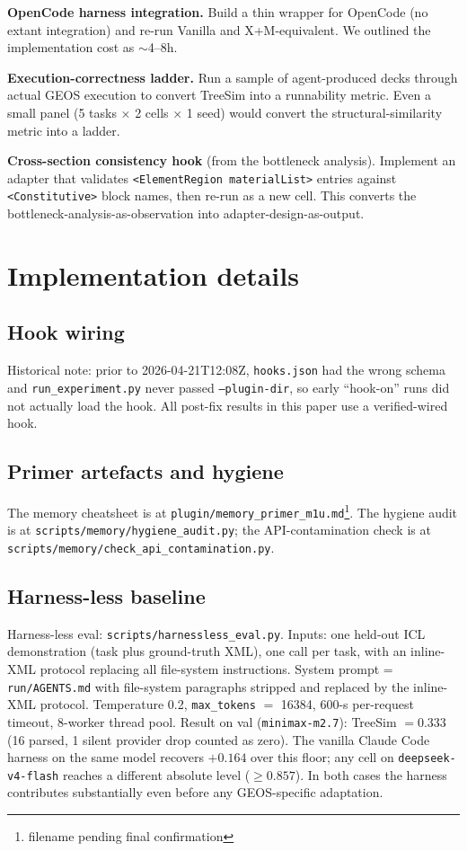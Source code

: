 \documentclass{article}
\begin{document}
\textbf{OpenCode harness integration.} Build a thin wrapper for OpenCode (no extant integration) and re-run Vanilla and X+M-equivalent. We outlined the implementation cost as $\sim$4--8h.

\textbf{Execution-correctness ladder.} Run a sample of agent-produced decks through actual GEOS execution to convert TreeSim into a runnability metric. Even a small panel (5 tasks × 2 cells × 1 seed) would convert the structural-similarity metric into a ladder.

\textbf{Cross-section consistency hook} (from the bottleneck analysis). Implement an adapter that validates \texttt{<ElementRegion materialList>} entries against \texttt{<Constitutive>} block names, then re-run as a new cell. This converts the bottleneck-analysis-as-observation into adapter-design-as-output.

\section{Implementation details}
\label{app:impl}

\subsection{Hook wiring}
Historical note: prior to 2026-04-21T12:08Z, \texttt{hooks.json} had the wrong schema and \texttt{run\_experiment.py} never passed \texttt{--plugin-dir}, so early ``hook-on'' runs did not actually load the hook. All post-fix results in this paper use a verified-wired hook.

\subsection{Primer artefacts and hygiene}
The memory cheatsheet is at \texttt{plugin/memory\_primer\_m1u.md}\footnote{filename pending final confirmation}. The hygiene audit is at \texttt{scripts/memory/hygiene\_audit.py}; the API-contamination check is at \texttt{scripts/memory/check\_api\_contamination.py}.

\subsection{Harness-less baseline}
\label{subsec:harnessless}
Harness-less eval: \texttt{scripts/harnessless\_eval.py}. Inputs: one held-out ICL demonstration (task plus ground-truth XML), one call per task, with an inline-XML protocol replacing all file-system instructions. System prompt = \texttt{run/AGENTS.md} with file-system paragraphs stripped and replaced by the inline-XML protocol. Temperature 0.2, \texttt{max\_tokens} $=$ 16384, 600-s per-request timeout, 8-worker thread pool. Result on val (\texttt{minimax-m2.7}): TreeSim $= 0.333$ (16 parsed, 1 silent provider drop counted as zero). The vanilla Claude Code harness on the same model recovers ${+}0.164$ over this floor; any cell on \texttt{deepseek-v4-flash} reaches a different absolute level ($\geq 0.857$). In both cases the harness contributes substantially even before any GEOS-specific adaptation.
\end{document}
